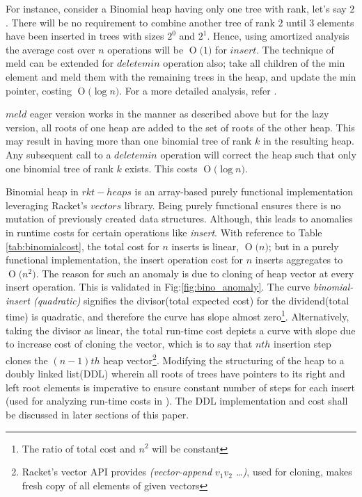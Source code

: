 \documentclass{llncs}
\newcommand{\BigO}[1]{\ensuremath{\operatorname{O}\bigl(#1\bigr)}}
\begin{document}
For instance, consider a Binomial heap having only one tree with rank, let's say $2$. There will be no requirement to combine another tree of rank $2$ until $3$ elements have been inserted in trees with sizes $2^0$ and $2^1$. Hence, using amortized analysis the  average cost over $n$ operations will be \BigO{1} for $insert$.  The technique of meld can be extended for $deletemin$ operation also; take all children of the min element and meld them with the remaining trees in the heap, and update the min pointer, costing \BigO{\log n}. For a more detailed analysis, refer \cite{kozen1992design}.

$meld$ eager version works in the manner as described above but for the lazy version, all roots of one heap are added to the set of roots of the other heap. This may result in having more than one binomial tree of rank $k$ in the resulting heap. Any subsequent call to a $deletemin$ operation will correct the heap such that only one binomial tree of rank $k$ exists. This costs \BigO{\log n}.

Binomial heap in $rkt-heaps$ is an array-based purely functional implementation leveraging Racket's $vectors$ library. Being purely functional ensures there is no mutation of previously created data structures. Although, this leads to anomalies in runtime costs for certain operations like \emph{insert}. With reference to Table \ref{tab:binomialcost}, the total cost for $n$ inserts is linear, \BigO{n}; but in a purely functional implementation, the insert operation cost for $n$ inserts aggregates to \BigO{n^2}. The reason for such an anomaly is due to cloning of heap vector at every insert operation. This is validated in Fig:\ref{fig:bino_anomaly}. The curve \emph{binomial-insert (quadratic)} signifies the divisor(total expected cost) for the dividend(total time) is quadratic, and therefore the curve has slope almost zero\footnote{The ratio of total cost and $n^2$ will be constant}. Alternatively, taking the divisor as linear, the total run-time cost depicts a curve with slope due to increase cost of cloning the vector, which is to say that $nth$ insertion step clones the $(n-1)th$ heap vector\footnote{Racket's vector API provides \emph{(vector-append $v_1 v_2$ \dots)}, used for cloning, makes fresh copy of all elements of given vectors}. Modifying the structuring of the heap to a doubly linked list(DDL) wherein all roots of trees have pointers to its right and left root elements is imperative to ensure constant number of steps for each insert (used for analyzing run-time costs in \cite{kozen1992design}). The DDL implementation and cost shall be discussed in later sections of this paper. 
\end{document}
